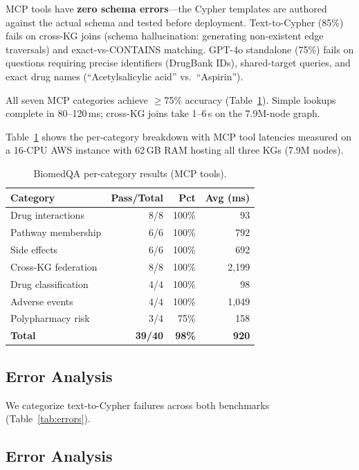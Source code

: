 \documentclass[sigconf, anonymous, review]{acmart}
\begin{document}
MCP tools have \textbf{zero schema errors}---the Cypher
templates are authored against the actual schema and tested
before deployment.  Text-to-Cypher (85\%) fails on cross-KG
joins (schema hallucination: generating non-existent edge
traversals) and exact-vs-CONTAINS matching.
GPT-4o standalone (75\%) fails on questions requiring precise
identifiers (DrugBank IDs), shared-target queries, and exact
drug names (``Acetylsalicylic acid'' vs.\ ``Aspirin'').

All seven MCP categories achieve $\geq$75\% accuracy
(Table~\ref{tab:biomedqa_cats}).  Simple lookups complete in
80--120\,ms; cross-KG joins take 1--6\,s on the 7.9M-node
graph.

Table~\ref{tab:biomedqa_cats} shows the per-category breakdown
with MCP tool latencies measured on a 16-CPU AWS instance
with 62\,GB RAM hosting all three KGs (7.9M nodes).

\begin{table}[t]
\centering
\caption{BiomedQA per-category results (MCP tools).}
\label{tab:biomedqa_cats}
\small
\begin{tabular}{@{}lrrr@{}}
\toprule
\textbf{Category} & \textbf{Pass/Total} & \textbf{Pct} & \textbf{Avg (ms)} \\
\midrule
Drug interactions    & 8/8  & 100\% &   93 \\
Pathway membership   & 6/6  & 100\% &  792 \\
Side effects         & 6/6  & 100\% &  692 \\
Cross-KG federation  & 8/8  & 100\% & 2,199 \\
Drug classification  & 4/4  & 100\% &   98 \\
Adverse events       & 4/4  & 100\% & 1,049 \\
Polypharmacy risk    & 3/4  &  75\% &  158 \\
\midrule
\textbf{Total}       & \textbf{39/40} & \textbf{98\%} & \textbf{920} \\
\bottomrule
\end{tabular}
\end{table}

\subsection{Error Analysis}

We categorize text-to-Cypher failures across both benchmarks
(Table~\ref{tab:errors}).

\subsection{Error Analysis}
\end{document}
